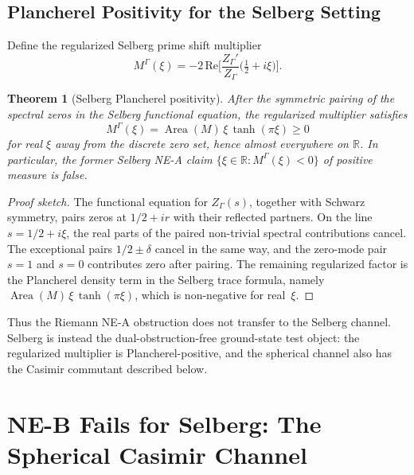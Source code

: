 \documentclass[12pt,a4paper]{article}
\newtheorem{theorem}{Theorem}[section]
\theoremstyle{definition}
\theoremstyle{remark}
\newcommand{\RR}{\mathbb{R}}
\newcommand{\Sel}{Z_{\Gamma}}
\begin{document}
\subsection{Plancherel Positivity for the Selberg Setting}

Define the regularized Selberg prime shift multiplier
\begin{equation}
\label{eq:Mxi-Sel}
M^\Gamma(\xi) = -2\,\mathrm{Re}\Big[\frac{\Sel'}{\Sel}\Big(\tfrac{1}{2}+i\xi\Big)\Big].
\end{equation}

\begin{theorem}[Selberg Plancherel positivity]
\label{thm:plancherel-positivity}
After the symmetric pairing of the spectral zeros in the Selberg functional
equation, the regularized multiplier satisfies
\begin{equation}
\label{eq:plancherel-positivity}
M^\Gamma(\xi)=\operatorname{Area}(M)\,\xi\,\tanh(\pi\xi)\ge 0
\end{equation}
for real $\xi$ away from the discrete zero set, hence almost everywhere on
$\RR$. In particular, the former Selberg NE-A claim
$\{\xi\in\RR:M^\Gamma(\xi)<0\}$ of positive measure is false.
\end{theorem}

\begin{proof}[Proof sketch]
The functional equation for $\Sel(s)$, together with Schwarz symmetry, pairs
zeros at $1/2+i r$ with their reflected partners.  On the line
$s=1/2+i\xi$, the real parts of the paired non-trivial spectral contributions
cancel.  The exceptional pairs $1/2\pm\delta$ cancel in the same way, and the
zero-mode pair $s=1$ and $s=0$ contributes zero after pairing.  The remaining
regularized factor is the Plancherel density term in the Selberg trace formula,
namely $\operatorname{Area}(M)\,\xi\,\tanh(\pi\xi)$, which is non-negative for
real~$\xi$.
\end{proof}

Thus the Riemann NE-A obstruction does not transfer to the Selberg channel.
Selberg is instead the dual-obstruction-free ground-state test object: the
regularized multiplier is Plancherel-positive, and the spherical channel also
has the Casimir commutant described below.


\section[NE-B Fails for Selberg: The Spherical Casimir Channel]{NE-B Fails for Selberg: The Spherical Casimir Channel}
\label{sec:ne-b-fails}
\end{document}
